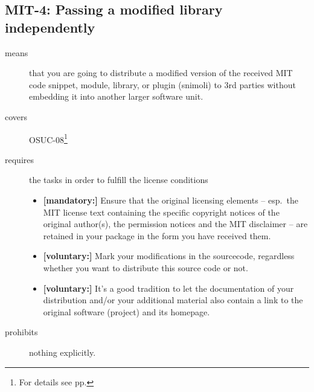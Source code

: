 \subsection{MIT-4: Passing a modified library independently}
\label{OSUC-08-MIT}
\begin{description}
\item[means] that you are going to distribute a modified version of the received
MIT code snippet, module, library, or plugin (snimoli) to 3rd parties without
embedding it into another larger software unit.
\item[covers] OSUC-08\footnote{For details see pp. \pageref{OSUC-08-DEF}}
\item[requires] the tasks in order to fulfill the license conditions
\begin{itemize}
  \item \textbf{[mandatory:]} Ensure that the original licensing elements -- esp.\
  the MIT license text containing the specific copyright notices of the original
  author(s), the permission notices and the MIT disclaimer -- are retained in
  your package in the form you have received them.
  \item \textbf{[voluntary:]} Mark your modifications in the sourcecode,
  regardless whether you want to distribute this source code or not.
  \item \textbf{[voluntary:]} It's a good tradition to let the documentation of
  your distribution and/or your additional material also contain a link to the
  original software (project) and its homepage.
\end{itemize}
\item[prohibits] nothing explicitly.
\end{description}


